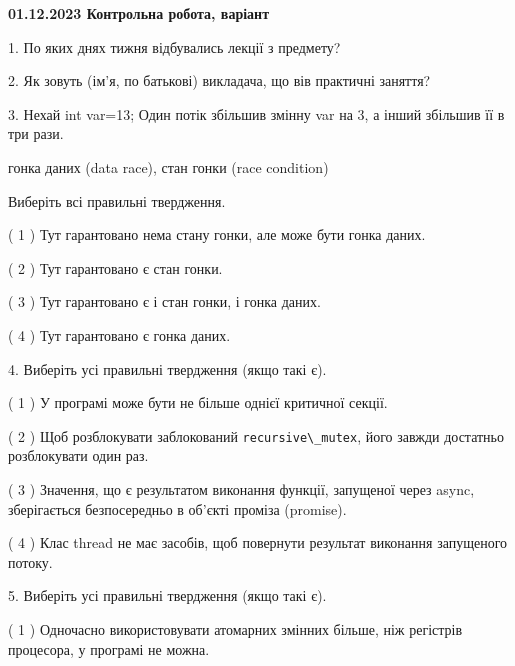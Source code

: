 \documentclass[12pt, ukrainian]{article}
\def\code#1{\Verb!#1!}
\begin{document}
\vspace{4mm}
\newpage
\begin {large}

\textbf{01.12.2023 Контрольна робота, варіант  }\par


{
1. По яких днях тижня відбувались лекції з предмету?



\vspace{5mm}
2. Як зовуть (ім'я, по батькові) викладача, що вів практичні заняття?



\vspace{5mm}
3. Нехай int var=13; Один потік збільшив змінну var на 3, а інший збільшив її в три рази.

гонка даних (data race), стан гонки (race condition)

Виберіть всі правильні твердження.\par
\vspace{2mm}
( 1 ) Тут гарантовано нема стану гонки, але може бути гонка даних.%

( 2 ) Тут гарантовано є стан гонки.%

( 3 ) Тут гарантовано є і стан гонки, і гонка даних.%

( 4 ) Тут гарантовано є гонка даних.%


\vspace{5mm}
4. Виберіть усі правильні твердження (якщо такі є).\par
\vspace{2mm}

( 1 ) У програмі може бути не більше однієї критичної секції.%

( 2 ) Щоб розблокувати заблокований \code{recursive\_mutex}, його завжди достатньо розблокувати один раз.%

( 3 ) Значення, що є результатом виконання функції, запущеної через async, зберігається безпосередньо в об’єкті проміза (promise).%

( 4 ) Клас thread не має засобів, щоб повернути результат виконання запущеного потоку.%


\vspace{5mm}
5. Виберіть усі правильні твердження (якщо такі є).\par
\vspace{2mm}

( 1 ) Одночасно використовувати атомарних змінних більше, ніж регістрів процесора, у програмі не можна.%

}
\end{large}
\end{document}

